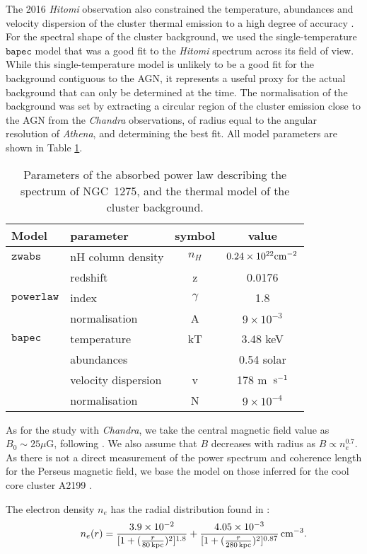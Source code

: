 \documentclass[fleqn,usenatbib,useAMS]{mnras}
\begin{document}
The 2016 {\it Hitomi} observation also constrained the temperature, abundances and velocity dispersion of the cluster thermal emission to a high degree of accuracy \citep{Aharonian:2016gzq}.
For the spectral shape of the cluster background, we used the single-temperature $\mathtt{bapec}$ model that was a good fit
to the {\it Hitomi} spectrum across its field of view. While this single-temperature model is unlikely to be a good fit for the background
contiguous to the AGN, it represents a useful proxy for the actual background that can only be determined at the time.
The normalisation of the background was set by extracting a circular region
of the cluster emission close to the AGN from the {\it Chandra} observations, of radius equal to the angular resolution of {\it Athena}, and determining the best fit. All model parameters are shown in Table \ref{parameters}.
\begin{table}
\centering
\begin{tabular}{l|l|c|c}
Model & parameter & symbol & value\\ \hline \hline
$\mathtt{zwabs}$ & nH column density & $n_H$ & $0.24 \times 10^{22} \rm{cm}^{-2}$\\
 & redshift & z & 0.0176\\ \hline
$\mathtt{powerlaw}$ & index & $\gamma$ & 1.8\\
 & normalisation & A & $9 \times 10^{-3}$\\ \hline
$\mathtt{bapec}$ & temperature & kT & 3.48 keV\\
 & abundances & & 0.54 solar\\
 & velocity dispersion & v & 178 m \,${\rm s}^{-1}$\\
& normalisation & N & $9 \times 10^{-4}$
\end{tabular}
\caption{Parameters of the absorbed power law describing the spectrum of NGC~1275, and the thermal model of the cluster background.}
\label{parameters}
\end{table}

As for the study with {\it Chandra}, we take the central magnetic field value as $B_0\sim 25\mu $G, following \citep{0602622}. We also
assume that $B$ decreases with radius as $B \propto n_{e}^{0.7}$.
As there is not a direct measurement of the power spectrum and coherence length for the Perseus magnetic field, we base the model on those inferred for the cool core cluster A2199 \citep{Vacca:2012up}.

The electron density $n_{e}$ has the radial distribution found in \citep{Churazov:2003hr}:
\begin{equation}
\qquad n_{e} (r) = \frac{3.9 \times 10^{-2}}{ [ 1 + (\frac{r}{80 \, {\rm kpc}})^2]^{1.8}} +  \frac{4.05 \times 10^{-3}}{ [ 1 + (\frac{r}{280 \, {\rm kpc}})^2]^{0.87}} \, {\rm cm}^{-3}.
\end{equation}
\end{document}
